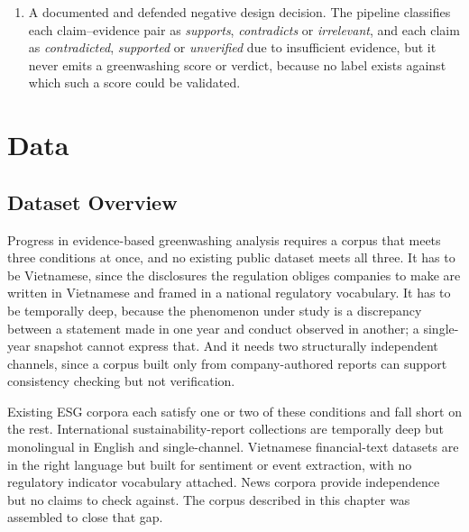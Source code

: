 \documentclass[fontsize=12pt,oneside,headings=small]{scrreprt}
\begin{document}
\begin{enumerate}
    \item A documented and defended negative design decision. The pipeline classifies each claim--evidence pair as \emph{supports}, \emph{contradicts} or \emph{irrelevant}, and each claim as \emph{contradicted}, \emph{supported} or \emph{unverified} due to insufficient evidence, but it never emits a greenwashing score or verdict, because no label exists against which such a score could be validated.
\end{enumerate}
\chapter{Data}
\label{ch:data}
\section{Dataset Overview}
Progress in evidence-based greenwashing analysis requires a corpus that meets three conditions at once, and no existing public dataset meets all three. It has to be Vietnamese, since the disclosures the regulation obliges companies to make are written in Vietnamese and framed in a national regulatory vocabulary. It has to be temporally deep, because the phenomenon under study is a discrepancy between a statement made in one year and conduct observed in another; a single-year snapshot cannot express that. And it needs two structurally independent channels, since a corpus built only from company-authored reports can support consistency checking but not verification.

Existing ESG corpora each satisfy one or two of these conditions and fall short on the rest. International sustainability-report collections are temporally deep but monolingual in English and single-channel. Vietnamese financial-text datasets are in the right language but built for sentiment or event extraction, with no regulatory indicator vocabulary attached. News corpora provide independence but no claims to check against. The corpus described in this chapter was assembled to close that gap.
\end{document}
